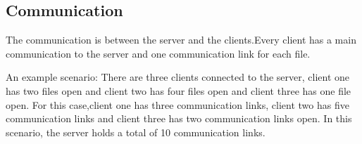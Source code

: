 \subsection{Communication}

The communication is between the server and the clients.Every client has a main communication to the server and one communication link for each file. 

An example scenario: There are three clients connected to the server, client one has two files open and client two has four files open and client three has one file open. For this case,client one has three communication links, client two has five communication links and client three has two communication links open. In this scenario, the server holds a total of 10 communication links. 
